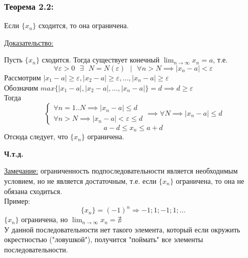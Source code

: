\documentclass[12pt]{article}
\def\posl#1#2{\{#1_{#2}\}}
\begin{document}
    \subsubsection*{Теорема 2.2:}
    Если $\posl{x}{n}$ сходится, то она ограничена.\par\noindent
    \underline{Доказательство:}
    \begin{adjustwidth}{1.5em}{1.5em}
        Пусть $\posl{x}{n}$ сходится. Тогда существует конечный $\lim_{n\to\infty}x_n = a$, т.е.
        \[
            \forall \varepsilon > 0 \text{ } \exists \text{ } N = N(\varepsilon) \text{ } \big| \text{ } \forall n > N \implies |x_n - a| < \varepsilon
        \]
        Рассмотрим $|x_{1} - a| \ge \varepsilon, |x_{2} - a| \ge \varepsilon, \dots, |x_n - a| \ge \varepsilon$\\
        Обозначим $max\{|x_{1} - a|, |x_{2} - a|, \dots, |x_n - a|\} = d \implies d \ge \varepsilon$\\
        Тогда
        \[
            \begin{cases}
                \forall n = 1..N \implies |x_n - a| \le d\\
                \forall n > N \implies |x_n - a| < \varepsilon \le d
            \end{cases}
            \implies
            \forall N \implies |x_n - a| \le d
        \]
        \[
            a - d \le x_n \le a + d
        \]
        Отсюда следует, что $\posl{x}{n}$ ограничена.\\
        \begin{center}
            \textbf{Ч.т.д.}
        \end{center}
    \end{adjustwidth}
    
    \noindent \underline{Замечание:} ограниченность подпоследовательности является необходимым условием, но не является достаточным, т.е. если $\posl{x}{n}$ ограничена, то она не обязана сходиться.\\
    Пример:
    \[
        \posl{x}{n} = (-1)^n \Rightarrow -1; 1; -1; 1; \dots
    \]
    $\posl{x}{n}$ ограничена, но $\lim_{n\to\infty}x_n = \nexists$\\
    У данной последовательности нет такого элемента, который если окружить окрестностью ("ловушкой"), получится "поймать" все элементы последовательности.
\end{document}
